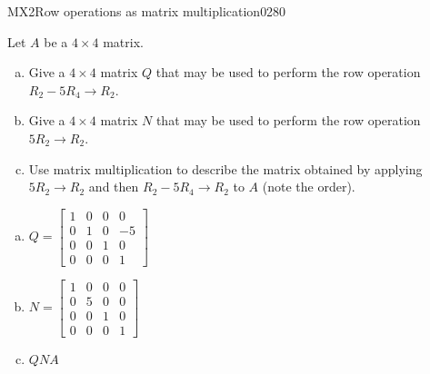 \begin{exercise}{MX2}{Row operations as matrix multiplication}{0280} 
\begin{exerciseStatement} 

Let \(A\) be a \(4 \times 4\) matrix.

 

\begin{enumerate}[(a)]
\item Give a \(4 \times 4\) matrix \(Q\) that may be used to perform the row operation \(R_2 - 5 R_4 \to R_2\).
\item Give a \(4 \times 4\) matrix \(N\) that may be used to perform the row operation \(5 R_2 \to R_2\).
\item Use matrix multiplication to describe the matrix obtained by applying \(5 R_2 \to R_2\) and then \(R_2 - 5 R_4 \to R_2\) to \(A\) (note the order). 
\end{enumerate}

     \end{exerciseStatement}
 \begin{exerciseAnswer} 

\begin{enumerate}[(a)]
\item \(Q=\left[\begin{array}{cccc}
1 & 0 & 0 & 0 \\
0 & 1 & 0 & -5 \\
0 & 0 & 1 & 0 \\
0 & 0 & 0 & 1
\end{array}\right]\)
\item \(N=\left[\begin{array}{cccc}
1 & 0 & 0 & 0 \\
0 & 5 & 0 & 0 \\
0 & 0 & 1 & 0 \\
0 & 0 & 0 & 1
\end{array}\right]\)
\item  \(QNA\) 
\end{enumerate}

     \end{exerciseAnswer}
 \end{exercise}


\newpage




